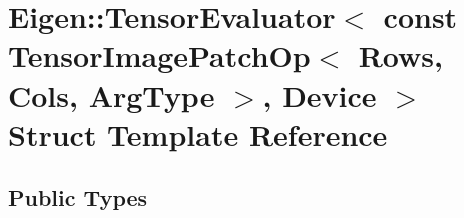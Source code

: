 \hypertarget{struct_eigen_1_1_tensor_evaluator_3_01const_01_tensor_image_patch_op_3_01_rows_00_01_cols_00_01_arg_type_01_4_00_01_device_01_4}{}\section{Eigen\+:\+:Tensor\+Evaluator$<$ const Tensor\+Image\+Patch\+Op$<$ Rows, Cols, Arg\+Type $>$, Device $>$ Struct Template Reference}
\label{struct_eigen_1_1_tensor_evaluator_3_01const_01_tensor_image_patch_op_3_01_rows_00_01_cols_00_01_arg_type_01_4_00_01_device_01_4}
\subsection*{Public Types}
